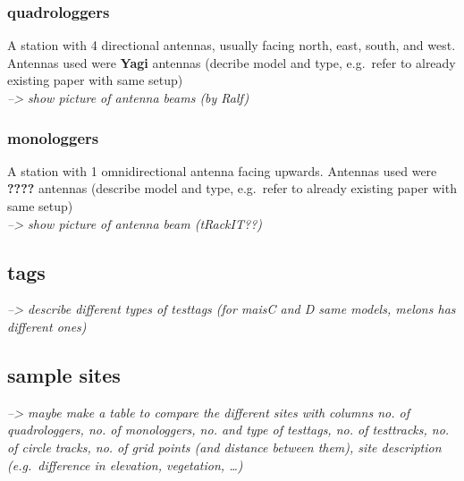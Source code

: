 \documentclass[
]{article}
\begin{document}
\subsubsection{quadrologgers}\label{quadrologgers}

A station with 4 directional antennas, usually facing north, east,
south, and west. Antennas used were \textbf{Yagi} antennas (decribe
model and type, e.g.~refer to already existing paper with same setup)\\
\emph{--\textgreater{} show picture of antenna beams (by Ralf)}

\subsubsection{monologgers}\label{monologgers}

A station with 1 omnidirectional antenna facing upwards. Antennas used
were \textbf{????} antennas (describe model and type, e.g.~refer to
already existing paper with same setup)\\
\emph{--\textgreater{} show picture of antenna beam (tRackIT??)}

\subsection{tags}\label{tags}

\emph{--\textgreater{} describe different types of testtags (for maisC
and D same models, melons has different ones)}

\subsection{sample sites}\label{sample-sites}

\emph{--\textgreater{} maybe make a table to compare the different sites
with columns no. of quadrologgers, no. of monologgers, no. and type of
testtags, no. of testtracks, no. of circle tracks, no. of grid points
(and distance between them), site description (e.g.~difference in
elevation, vegetation, \ldots)}
\end{document}
